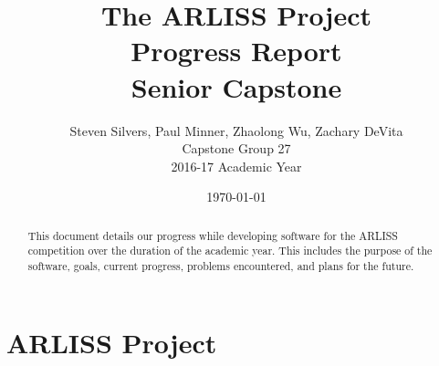 \documentclass[10pt,letterpaper,onecolumn,draftclsnofoot,journal]{IEEEtran}
\begin{document}
\begin{titlepage}
	\title{The ARLISS Project\\Progress Report\\Senior Capstone}
	\author{Steven Silvers, Paul Minner, Zhaolong Wu, Zachary DeVita\\
		Capstone Group 27\\2016-17 Academic Year}
	\date{\today}
	\maketitle
	\vspace{4cm}
	\begin{abstract}
		\noindent This document details our progress while developing software for the ARLISS competition over the duration of the academic year. This includes the purpose of the software, goals, current progress, problems encountered, and plans for the future. 
	\end{abstract}

\end{titlepage}
\begingroup
  \flushbottom
  \setlength{\parskip}{0pt plus .1fil}%
  \tableofcontents
  \newpage
\endgroup

\section{\textbf{ARLISS Project}}
\end{document}
